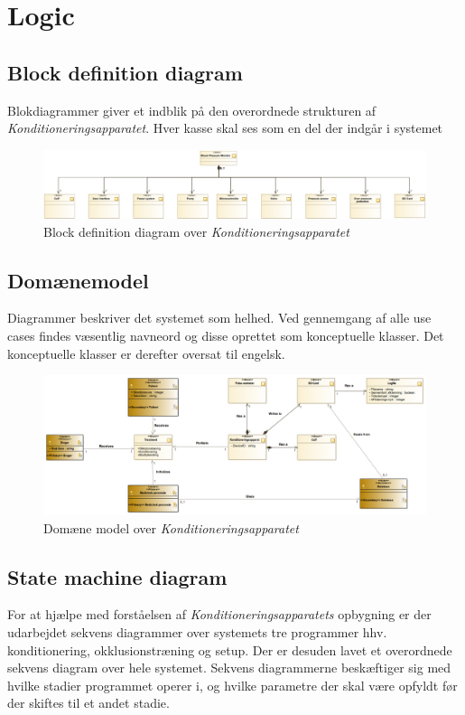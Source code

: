 \newpage
\section{Logic}

\subsection{Block definition diagram}
Blokdiagrammer giver et indblik på den overordnede strukturen af \textit{Konditioneringsapparatet}.  Hver kasse skal ses som en del der indgår i systemet \\
\begin{figure}[H]
	\includegraphics[width=\textwidth]{pdfs/BD-crop.pdf}
	\caption{Block definition diagram over \textit{Konditioneringsapparatet}}
\end{figure}


\subsection{Domænemodel}
Diagrammer beskriver det systemet som helhed. Ved gennemgang af alle use cases findes væsentlig navneord og disse oprettet som konceptuelle klasser. Det konceptuelle klasser er derefter oversat til engelsk. \\
\begin{figure}[H]
	\includegraphics[width=\textwidth]{pdfs/DomainModel.png}
	\caption{Domæne model over \textit{Konditioneringsapparatet}}
\end{figure}


\newpage
\subsection{State machine diagram}
For at hjælpe med forståelsen af \textit{Konditioneringsapparatets} opbygning er der udarbejdet sekvens diagrammer over systemets tre programmer hhv. konditionering, okklusionstræning og setup. Der er desuden lavet et overordnede sekvens diagram over hele systemet. 
Sekvens diagrammerne beskæftiger sig med hvilke stadier programmet operer i, og hvilke parametre der skal være opfyldt før der skiftes til et andet stadie. 
 
